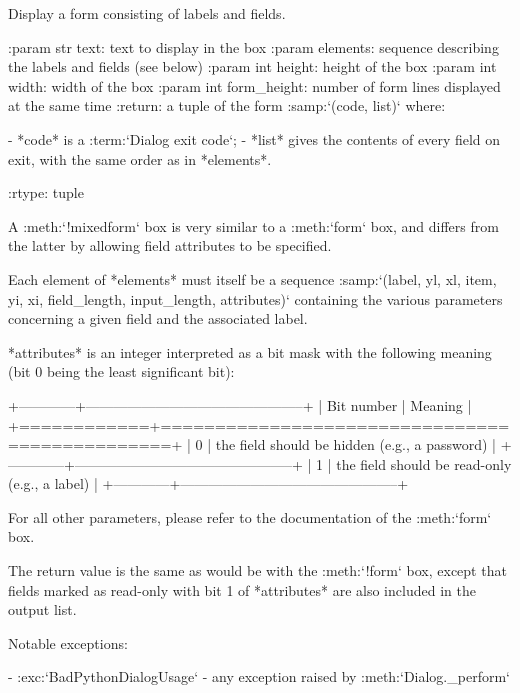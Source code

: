 \begin{DoxyVerb}Display a form consisting of labels and fields.

:param str text:        text to display in the box
:param elements:        sequence describing the labels and
                fields (see below)
:param int height:      height of the box
:param int width:       width of the box
:param int form_height: number of form lines displayed at the
                same time
:return: a tuple of the form :samp:`({code}, {list})` where:

  - *code* is a :term:`Dialog exit code`;
  - *list* gives the contents of every field on exit, with the
    same order as in *elements*.

:rtype: tuple

A :meth:`!mixedform` box is very similar to a :meth:`form` box,
and differs from the latter by allowing field attributes to be
specified.

Each element of *elements* must itself be a sequence
:samp:`({label}, {yl}, {xl}, {item}, {yi}, {xi}, {field_length},
{input_length}, {attributes})` containing the various parameters
concerning a given field and the associated label.

*attributes* is an integer interpreted as a bit mask with the
following meaning (bit 0 being the least significant bit):

+------------+-----------------------------------------------+
| Bit number |                    Meaning                    |
+============+===============================================+
|     0      | the field should be hidden (e.g., a password) |
+------------+-----------------------------------------------+
|     1      | the field should be read-only (e.g., a label) |
+------------+-----------------------------------------------+

For all other parameters, please refer to the documentation of
the :meth:`form` box.

The return value is the same as would be with the :meth:`!form`
box, except that fields marked as read-only with bit 1 of
*attributes* are also included in the output list.

Notable exceptions:

  - :exc:`BadPythonDialogUsage`
  - any exception raised by :meth:`Dialog._perform`\end{DoxyVerb}
